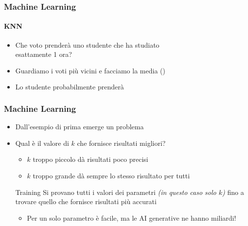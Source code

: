 \begin{exampleframe}
    \frametitle{Machine Learning}
    \framesubtitle{KNN}

    \begin{itemize}
        \item Che voto prenderà uno studente che ha studiato\\esattamente 1 ora?
        \item<2-> Guardiamo i voti più vicini e facciamo la media ()
    \end{itemize}


    \begin{itemize}
        \item<4-> Lo studente probabilmente prenderà 
    \end{itemize}
\end{exampleframe}

\begin{contentframe}
    \frametitle{Machine Learning}

    \begin{itemize}
        \item Dall'esempio di prima emerge un problema

        \bigskip
        \item Qual è il valore di $k$ che fornisce risultati migliori?
        \begin{itemize}
            \item $k$ troppo piccolo dà risultati poco precisi
            \item $k$ troppo grande dà sempre lo stesso risultato per tutti
        \end{itemize}

        \pause
        \begin{block}{Training}
            Si provano tutti i valori dei parametri \textit{(in questo caso solo $k$)} fino a trovare quello che fornisce risultati più accurati
        \end{block}

        \begin{itemize}
            \item Per un solo parametro è facile, ma le AI generative ne hanno miliardi!
        \end{itemize}
    \end{itemize}
\end{contentframe}

